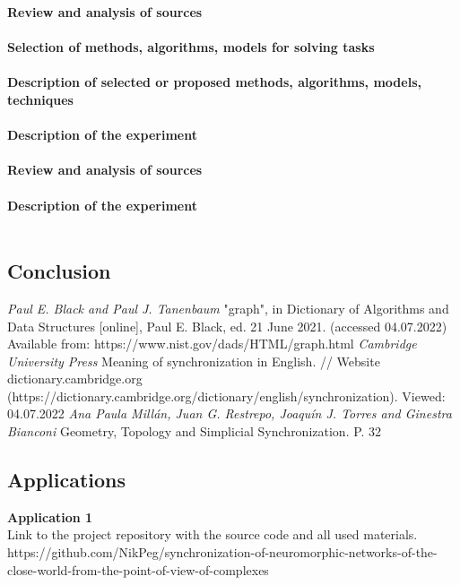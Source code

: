 \documentclass[draft]{article}
\newcommand\zz[1]{\par{\normalsize\strut #1} \hfill\ignorespaces}
\begin{document}
\textbf{Review and analysis of sources}\\
~\\
\textbf{Selection of methods, algorithms, models for solving tasks}\\
~\\
\textbf{Description of selected or proposed methods, algorithms, models, techniques}\\
~\\
\textbf{Description of the experiment}\\
~\\
\textbf{Review and analysis of sources}\\
~\\
\textbf{Description of the experiment}\\
~\\

\newpage
\begin{center}
\section {Conclusion}
\end{center}

\newpage
\begin{center}
\begin{thebibliography}{}
 \textit{Paul E. Black and Paul J. Tanenbaum} "graph", in Dictionary of Algorithms and Data Structures [online], Paul E. Black, ed. 21 June 2021. (accessed 04.07.2022) Available from: https://www.nist.gov/dads/HTML/graph.html
 \textit{Cambridge University Press} Meaning of synchronization in English. // Website dictionary.cambridge.org (https://dictionary.cambridge.org/dictionary/english/synchronization). Viewed: 04.07.2022
 \textit{Ana Paula Millán, Juan G. Restrepo, Joaquín J. Torres and Ginestra Bianconi} Geometry, Topology and Simplicial Synchronization. P. 32
\end{thebibliography}
\end{center}
\newpage
\begin{center}
\section {Applications}
\end{center}
\zz{}\textbf{Application 1\\}
Link to the project repository with the source code and all used materials.\\
https://github.com/NikPeg/synchronization-of-neuromorphic-networks-of-the-close-world-from-the-point-of-view-of-complexes\\
\end{document}
